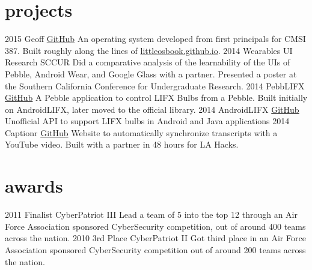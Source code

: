 \documentclass[]{akers-cv}
\begin{document}
\section{projects}

\begin{entrylist}
  \entry
    {2015}
    {Geoff}
    {\href{https://github.com/akrs/cmsi387}{GitHub}}
    {An operating system developed from first principals for CMSI 387. Built roughly along the lines of \href{http://littleosbook.github.io}{littleosbook.github.io}.}
  \entry
    {2014}
    {Wearables UI Research}
    {SCCUR}
    {Did a comparative analysis of the learnability of the UIs of Pebble, Android Wear, and Google Glass with a partner. Presented a poster at the Southern California Conference for Undergraduate Research.}
  \entry
    {2014}
    {PebbLIFX}
    {\href{https://github.com/jadengore/PebbLIFX}{GitHub}}
    {A Pebble application to control LIFX Bulbs from a Pebble. Built initially on AndroidLIFX, later moved to the official library.}
  \entry
    {2014}
    {AndroidLIFX}
    {\href{https://github.com/akrs/AndroidLIFX}{GitHub}}
    {Unofficial API to support LIFX bulbs in Android and Java applications}
  \entry
    {2014}
    {Captionr}
    {\href{http://https://github.com/alexschneider/Captionr}{GitHub}}
    {Website to automatically synchronize transcripts with a YouTube video. Built with a partner in 48 hours for LA Hacks.}
\end{entrylist}

\section{awards}
\begin{entrylist}
  \entry
    {2011}
    {Finalist}
    {CyberPatriot III}
    {Lead a team of 5 into the top 12 through an Air Force Association sponsored CyberSecurity competition, out of around 400 teams across the nation.}
  \entry
    {2010}
    {3rd Place}
    {CyberPatriot II}
    {Got third place in an Air Force Association sponsored CyberSecurity competition out of around 200 teams across the nation.}
 \end{entrylist}
\end{document}
